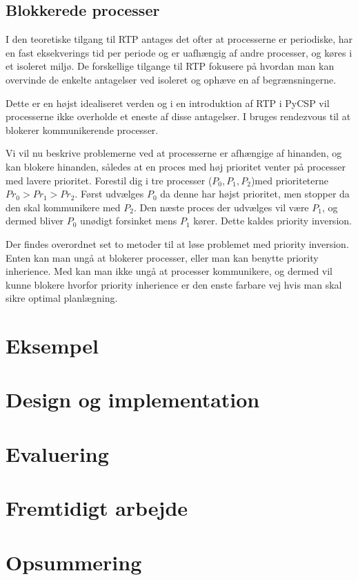 \subsection{Blokkerede processer}
I den teoretiske tilgang til RTP antages det ofter at processerne er periodiske, har en fast eksekverings tid per periode og er uafhængig af andre processer, og køres i et isoleret miljø. De forskellige tilgange til RTP fokusere på hvordan man kan overvinde de enkelte antagelser ved isoleret og ophæve en af begrænsningerne.

Dette er en højst idealiseret verden og i en introduktion af RTP i PyCSP vil processerne ikke overholde et eneste af disse antagelser. 
I \pycsp bruges rendezvous til at blokerer kommunikerende  processer.

Vi vil nu beskrive problemerne ved at processerne er afhængige af hinanden, og kan blokere hinanden, således at en proces med høj prioritet venter på processer med lavere prioritet. Forestil dig i \pycsp tre processer ($P_0,P_1,P_2$)med prioriteterne $Pr_0>Pr_1>Pr_2$. Først udvælges $P_0$ da denne har højst prioritet, men stopper da den skal kommunikere med $P_2$. Den næste proces der udvælges vil være $P_1$, og dermed bliver $P_0$ unødigt forsinket mens $P_1$ kører. Dette kaldes priority inversion\cite{sha1990priority}.

Der findes overordnet set to metoder til at løse problemet med priority inversion. Enten kan man ungå at blokerer processer, eller man kan benytte priority inherience\cite{sha1990priority}. Med \pycsp kan man ikke ungå at processer kommunikere, og dermed vil kunne blokere hvorfor priority inherience er den enste farbare vej hvis man skal sikre optimal planlægning.

  \section{Eksempel}
  \section{Design og implementation}
  \section{Evaluering}
  \section{Fremtidigt arbejde}
  \section{Opsummering}
